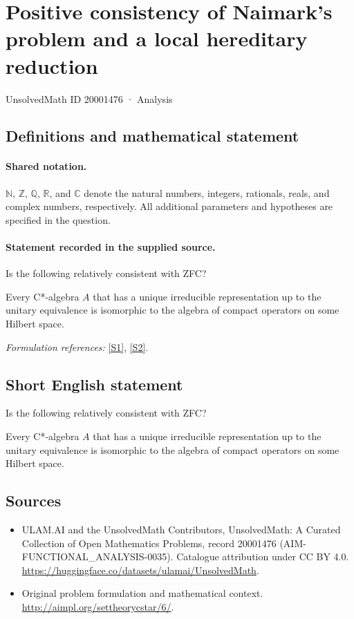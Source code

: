 \documentclass[11pt]{article}
\newcommand{\sref}[2]{\hyperlink{source:#1:#2}{[S#2]}}
\begin{document}
\setcounter{section}{20001475}
\section{Positive consistency of Naimark's problem and a local hereditary reduction}\label{20001476}
{\small UnsolvedMath ID 20001476 · Analysis}
\subsection{Definitions and mathematical statement}

\paragraph{Shared notation.}$\mathbb N$, $\mathbb Z$, $\mathbb Q$, $\mathbb R$, and $\mathbb C$ denote the natural numbers, integers, rationals, reals, and complex numbers, respectively. All additional parameters and hypotheses are specified in the question.


\paragraph{Statement recorded in the supplied source.}
Is the following relatively consistent with ZFC?

Every C*-algebra $A$ that has a unique irreducible representation up to the
unitary equivalence is isomorphic to the algebra of compact operators on some
Hilbert space.
\par\smallskip\textit{Formulation references:} \sref{20001476}{1}, \sref{20001476}{2}.
\subsection{Short English statement}
Is the following relatively consistent with ZFC?

Every C*-algebra $A$ that has a unique irreducible representation up to the
unitary equivalence is isomorphic to the algebra of compact operators on some
Hilbert space.
\subsection{Sources}
\begin{itemize}
\item[\hypertarget{source:20001476:1}{S1}] ULAM.AI and the UnsolvedMath Contributors, UnsolvedMath: A Curated Collection of Open Mathematics Problems, record 20001476 (AIM-FUNCTIONAL\_ANALYSIS-0035). Catalogue attribution under CC BY 4.0.
\url{https://huggingface.co/datasets/ulamai/UnsolvedMath}.
\item[\hypertarget{source:20001476:2}{S2}] Original problem formulation and mathematical context.
\url{http://aimpl.org/settheorycstar/6/}.
\end{itemize}
\label{end:20001476}
\end{document}
